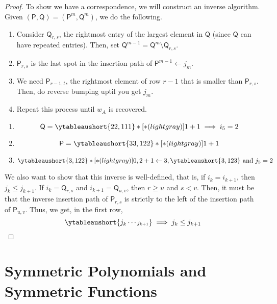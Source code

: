 \documentclass[11pt,leqno,oneside]{amsart}
\numberwithin{thm}{section}
\newcommand{\TP}{\mathsf{P}}
\newcommand{\TQ}{\mathsf{Q}}
\begin{document}
\begin{proof}
  To show we have a correspondence, we will construct an inverse
  algorithm. Given \((\TP, \TQ) = (\TP^m, \TQ^m)\), we do the
  following.
  \begin{enumerate}[label=(\arabic*)]
  \item Consider \(\TQ_{r,s}\), the rightmost entry of the largest
    element in \(\TQ\) (since \(\TQ\) can have repeated entries). Then,
    set \(\TQ^{m-1} = \TQ^m \setminus \TQ_{r,s}\).
  \item \(\TP_{r,s}\) is the last spot in the insertion path of
    \(\TP^{m-1} \leftarrow j_m\).
  \item We need \(\TP_{r-1,t}\), the rightmost element of row \(r-1\)
    that is smaller than \(\TP_{r,s}\). Then, do reverse bumping uptil
    you get \(j_m\).
  \item Repeat this process until \(w_A\) is recovered.
  \end{enumerate}
  \begin{example}
    \begin{enumerate}
    \item     \[
      \TQ = \ytableaushort{22,111}*[*(lightgray)]{1+1} \implies i_5 = 2
    \]
    \item \[
      \TP = \ytableaushort{33,122}*[*(lightgray)]{1+1}
    \]
  \item \[
      \ytableaushort{3,122}*[*(lightgray)]{0,2+1} \leftarrow 3,
      \ytableaushort{3,123} \text{ and } j_5 = 2
    \]
    \end{enumerate}
  \end{example}
  We also want to show that this inverse is well-defined, that is, if
  \(i_k = i_{k+1}\), then \(j_k \leq j_{k+1}\). If \(i_k = \TQ_{r,s}\)
  and \(i_{k+1} = \TQ_{u,v}\), then \(r \geq u\) and \(s < v\). Then,
  it must be that the inverse insertion path of \(\TP_{r,s}\) is
  strictly to the left of the insertion path of \(\TP_{u,v}\). Thus,
  we get, in the first row, \[
\ytableaushort{{j_k}\cdots{\scriptstyle j_{k+1}}} \implies j_k \leq j_{k+1}
  \]
\end{proof}
\section{Symmetric Polynomials and Symmetric Functions}
\end{document}
